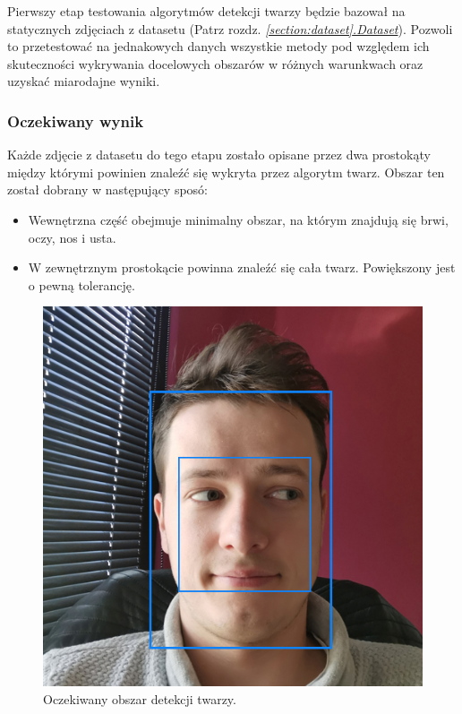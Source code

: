 \documentclass[10pt, a4paper]{article}
\begin{document}
Pierwszy etap testowania algorytmów detekcji twarzy będzie bazował na statycznych zdjęciach z datasetu (Patrz rozdz. \hyperref[section:dataset]{\textit{\ref{section:dataset}.Dataset}}). Pozwoli to przetestować na jednakowych danych wszystkie metody pod względem ich skuteczności wykrywania docelowych obszarów w różnych warunkwach oraz uzyskać miarodajne wyniki.

\subsubsection{Oczekiwany wynik}

Każde zdjęcie z datasetu do tego etapu zostało opisane przez dwa prostokąty między którymi powinien znaleźć się wykryta przez algorytm twarz. Obszar ten został dobrany w następujący sposó:

\begin{itemize}
    \item Wewnętrzna część obejmuje minimalny obszar, na którym znajdują się brwi, oczy, nos i usta.
    \item W zewnętrznym prostokącie powinna znaleźć się cała twarz. Powiększony jest o pewną tolerancję. 
\end{itemize}

\begin{figure}[H]
    \begin{center}
        \includegraphics[scale=0.3]{images/face_test_expected.jpg}
        \caption{Oczekiwany obszar detekcji twarzy. }
        \label{fig:face_test_expected}
    \end{center}
\end{figure}
\end{document}
